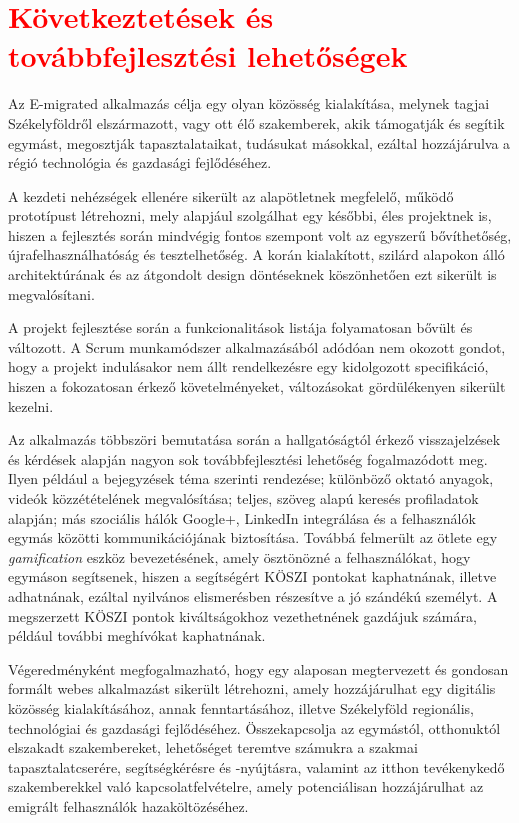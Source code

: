 \chapter{\textcolor{red}{Következtetések és továbbfejlesztési lehetőségek}}
\label{ch:kovetkeztetes}

Az E-migrated alkalmazás célja egy olyan közösség kialakítása, melynek tagjai Székelyföldről elszármazott, vagy ott élő szakemberek, akik támogatják és segítik egymást, megosztják tapasztalataikat, tudásukat másokkal, ezáltal hozzájárulva a régió technológia és gazdasági fejlődéséhez. 

A kezdeti nehézségek ellenére sikerült az alapötletnek megfelelő, működő prototípust létrehozni, mely alapjául szolgálhat egy későbbi, éles projektnek is, hiszen a fejlesztés során mindvégig fontos szempont volt az egyszerű bővíthetőség, újrafelhasználhatóság és tesztelhetőség.  A korán kialakított, szilárd alapokon álló architektúrának és az átgondolt design döntéseknek köszönhetően ezt sikerült is megvalósítani. 

A projekt fejlesztése során a funkcionalitások listája folyamatosan bővült és változott. A Scrum munkamódszer alkalmazásából adódóan nem okozott gondot, hogy a projekt indulásakor nem állt rendelkezésre egy kidolgozott specifikáció, hiszen a fokozatosan érkező követelményeket, változásokat gördülékenyen sikerült kezelni. 

Az alkalmazás többszöri bemutatása során a hallgatóságtól érkező visszajelzések és kérdések alapján nagyon sok továbbfejlesztési lehetőség fogalmazódott meg. Ilyen például a bejegyzések téma szerinti rendezése; különböző oktató anyagok, videók közzétételének megvalósítása; teljes, szöveg alapú keresés profiladatok alapján; más szociális hálók Google+, LinkedIn integrálása és a felhasználók egymás közötti kommunikációjának biztosítása. Továbbá felmerült az ötlete egy \textit{gamification} eszköz bevezetésének, amely ösztönözné a felhasználókat, hogy egymáson segítsenek, hiszen a segítségért KÖSZI pontokat kaphatnának, illetve adhatnának, ezáltal nyilvános elismerésben részesítve a jó szándékú személyt. A megszerzett KÖSZI pontok kiváltságokhoz vezethetnének gazdájuk számára, például további meghívókat kaphatnának. 

Végeredményként megfogalmazható, hogy egy alaposan megtervezett és gondosan formált webes alkalmazást sikerült létrehozni, amely hozzájárulhat egy digitális közösség kialakításához, annak fenntartásához, illetve Székelyföld regionális, technológiai és gazdasági fejlődéséhez. Összekapcsolja az egymástól, otthonuktól elszakadt szakembereket, lehetőséget teremtve számukra a szakmai tapasztalatcserére, segítségkérésre és -nyújtásra, valamint az itthon tevékenykedő szakemberekkel való kapcsolatfelvételre, amely potenciálisan hozzájárulhat az emigrált felhasználók hazaköltözéséhez. 
